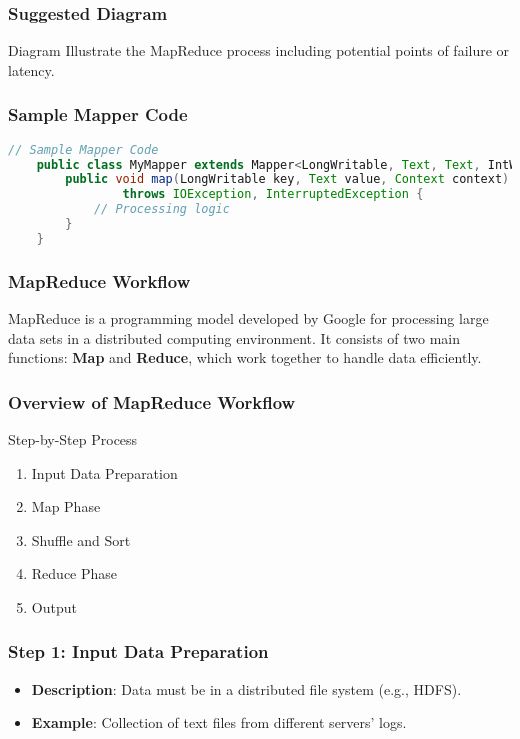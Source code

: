 \documentclass[aspectratio=169]{beamer}
\begin{document}
\begin{frame}[fragile]
    \frametitle{Suggested Diagram}
    \begin{block}{Diagram}
        Illustrate the MapReduce process including potential points of failure or latency.
    \end{block}
\end{frame}

\begin{frame}[fragile]
    \frametitle{Sample Mapper Code}
    \begin{lstlisting}[language=Java]
    // Sample Mapper Code
    public class MyMapper extends Mapper<LongWritable, Text, Text, IntWritable> {
        public void map(LongWritable key, Text value, Context context) 
                throws IOException, InterruptedException {
            // Processing logic
        }
    }
    \end{lstlisting}
\end{frame}

\begin{frame}
  \frametitle{MapReduce Workflow}
  MapReduce is a programming model developed by Google for processing large data sets in a distributed computing environment. It consists of two main functions: \textbf{Map} and \textbf{Reduce}, which work together to handle data efficiently.
\end{frame}

\begin{frame}[fragile]
  \frametitle{Overview of MapReduce Workflow}
  \begin{block}{Step-by-Step Process}
    \begin{enumerate}
      \item Input Data Preparation
      \item Map Phase
      \item Shuffle and Sort
      \item Reduce Phase
      \item Output
    \end{enumerate}
  \end{block}
\end{frame}

\begin{frame}[fragile]
  \frametitle{Step 1: Input Data Preparation}
  \begin{itemize}
    \item \textbf{Description}: Data must be in a distributed file system (e.g., HDFS).
    \item \textbf{Example}: Collection of text files from different servers' logs.
  \end{itemize}
\end{frame}
\end{document}
